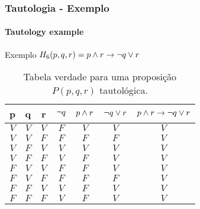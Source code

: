 \begin{frame}[t]
    \frametitle{Tautologia - Exemplo}
    \framesubtitle{Tautology example}
    \begin{exampleblock}{Exemplo}
        \centering
        $H_6(p,q,r) = p \land r \rightarrow \lnot q \lor r $
        \vspace{-2mm}
        \begin{table}[t]
            \caption{Tabela verdade para uma proposição $P(p,q,r)$ tautológica.}
            \label{tab:exemple-tautology}
            \begin{tabular}{|c|c|c|c|c|c|c|}
            \hline
            \textbf{p} & \textbf{q} & \textbf{r} & $\lnot q$ & $p \land r$ & $\lnot q \lor r$ & $p \land r \rightarrow \lnot q \lor r$ \\ \hline
            $V$        & $V$        & $V$        & $F$    & $V$      & $V$          & $V$                    \\ \hline
            $V$        & $V$        & $F$        & $F$    & $F$      & $F$          & $V$                    \\ \hline
            $V$        & $F$        & $V$        & $V$    & $V$      & $V$          & $V$                    \\ \hline
            $V$        & $F$        & $F$        & $V$    & $F$      & $V$          & $V$                    \\ \hline
            $F$        & $V$        & $V$        & $F$    & $F$      & $V$          & $V$                    \\ \hline
            $F$        & $V$        & $F$        & $F$    & $F$      & $F$          & $V$                    \\ \hline
            $F$        & $F$        & $V$        & $V$    & $F$      & $V$          & $V$                    \\ \hline
            $F$        & $F$        & $F$        & $V$    & $F$      & $V$          & $V$                    \\ \hline
            \end{tabular}
        \end{table}
    \end{exampleblock}
\end{frame}
%
